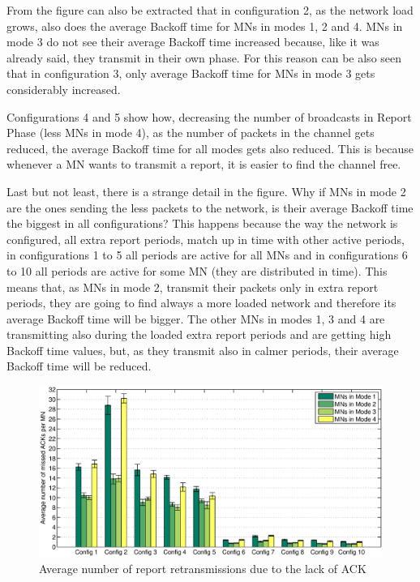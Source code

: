 From the figure can also be extracted that in configuration 2, as the network load grows, also does the average Backoff time for \acp{MN} in modes 1, 2 
and 4. \acp{MN} in mode 3 do not see their average Backoff time increased because, like it was already said, they transmit in their own phase. For this
reason can be also seen that in configuration 3, only average Backoff time for \acp{MN} in mode 3 gets considerably increased.

Configurations 4 and 5 show how, decreasing the number of broadcasts in Report Phase (less \acp{MN} in mode 4), as the number of packets in the channel
gets reduced, the average Backoff time for all modes gets also reduced. This is because whenever a \ac{MN} wants to transmit a report, it is easier to 
find the channel free.

Last but not least, there is a strange detail in the figure. Why if \acp{MN} in mode 2 are the ones sending the less packets to the network, is their 
average Backoff time the biggest in all configurations? This happens because the way the network is configured, all extra report periods, match up in time
with other active periods, in configurations 1 to 5 all periods are active for all \acp{MN} and in configurations 6 to 10 all periods are active for 
some \ac{MN} (they are distributed in time). This means that, as \acp{MN} in mode 2, transmit their packets only in extra report periods, they are going to 
find always a more loaded network and therefore its average Backoff time will be bigger. The other \acp{MN} in modes 1, 3 and 4 are transmitting  
also during the loaded extra report periods and are getting high Backoff time values, but, as they transmit also in calmer periods, their average Backoff time will be reduced.

\begin{figure}[ht]
 \begin{center}
  \includegraphics[width=1\textwidth]{nbMissedACKMN.eps}
 \end{center}
 \caption{Average number of report retransmissions due to the lack of ACK}
 \label{fig:nbMissedACKMN}
\end{figure}

